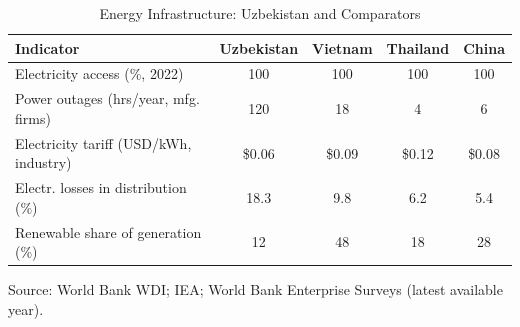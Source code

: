 \begin{table}[!h]
\centering
\caption{\label{tab:energy}Energy Infrastructure: Uzbekistan and Comparators}
\centering
\begin{threeparttable}
\begin{tabular}[t]{lcccc}
\toprule
Indicator & Uzbekistan & Vietnam & Thailand & China\\
\midrule
Electricity access (\%, 2022) & 100 & 100 & 100 & 100\\
Power outages (hrs/year, mfg. firms) & 120 & 18 & 4 & 6\\
Electricity tariff (USD/kWh, industry) & \$0.06 & \$0.09 & \$0.12 & \$0.08\\
Electr. losses in distribution (\%) & 18.3 & 9.8 & 6.2 & 5.4\\
Renewable share of generation (\%) & 12 & 48 & 18 & 28\\
\bottomrule
\end{tabular}
\begin{tablenotes}
\item Source: World Bank WDI; IEA; World Bank Enterprise Surveys (latest available year).
\end{tablenotes}
\end{threeparttable}
\end{table}
